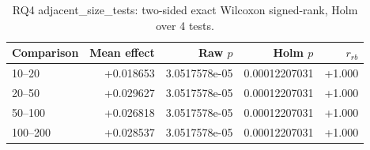 \begin{longtable}{lrrrr}
\caption{RQ4 adjacent\_size\_tests: two-sided exact Wilcoxon signed-rank, Holm over 4 tests.}\\
\toprule
Comparison & Mean effect & Raw $p$ & Holm $p$ & $r_{rb}$ \\
\midrule
10--20 & +0.018653 & 3.0517578e-05 & 0.00012207031 & +1.000 \\
20--50 & +0.029627 & 3.0517578e-05 & 0.00012207031 & +1.000 \\
50--100 & +0.026818 & 3.0517578e-05 & 0.00012207031 & +1.000 \\
100--200 & +0.028537 & 3.0517578e-05 & 0.00012207031 & +1.000 \\
\bottomrule
\end{longtable}
